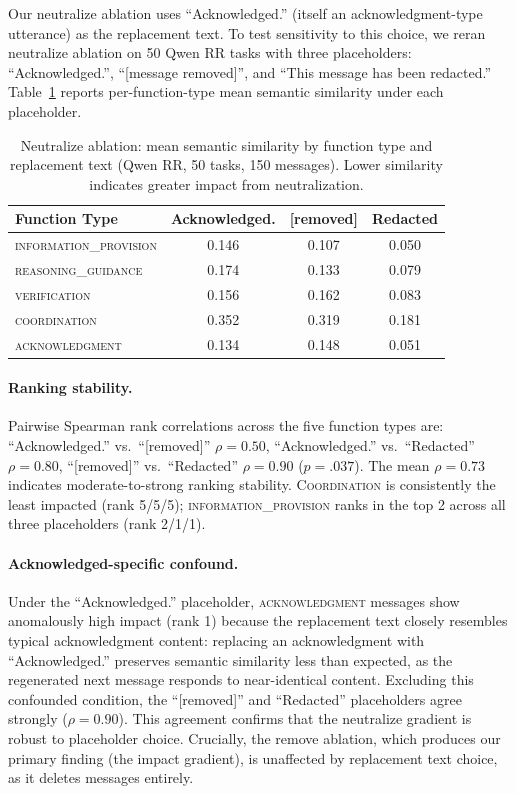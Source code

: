 Our neutralize ablation uses ``Acknowledged.'' (itself an acknowledgment-type utterance) as the replacement text. To test sensitivity to this choice, we reran neutralize ablation on 50 Qwen RR tasks with three placeholders: ``Acknowledged.'', ``{[message removed]}'', and ``This message has been redacted.'' Table~\ref{tab:placeholder_sensitivity} reports per-function-type mean semantic similarity under each placeholder.

\begin{table}[htbp]
\centering
\caption{Neutralize ablation: mean semantic similarity by function type and replacement text (Qwen RR, 50 tasks, 150 messages). Lower similarity indicates greater impact from neutralization.}
\label{tab:placeholder_sensitivity}
\small
\begin{tabular}{lccc}
\toprule
\textbf{Function Type} & \textbf{Acknowledged.} & \textbf{[removed]} & \textbf{Redacted} \\
\midrule
\textsc{information\_provision} & 0.146 & 0.107 & 0.050 \\
\textsc{reasoning\_guidance}    & 0.174 & 0.133 & 0.079 \\
\textsc{verification}           & 0.156 & 0.162 & 0.083 \\
\textsc{coordination}           & 0.352 & 0.319 & 0.181 \\
\textsc{acknowledgment}         & 0.134 & 0.148 & 0.051 \\
\bottomrule
\end{tabular}
\end{table}

\paragraph{Ranking stability.} Pairwise Spearman rank correlations across the five function types are: ``Acknowledged.'' vs.\ ``{[removed]}'' $\rho = 0.50$, ``Acknowledged.'' vs.\ ``Redacted'' $\rho = 0.80$, ``{[removed]}'' vs.\ ``Redacted'' $\rho = 0.90$ ($p = .037$). The mean $\rho = 0.73$ indicates moderate-to-strong ranking stability. \textsc{Coordination} is consistently the least impacted (rank 5/5/5); \textsc{information\_provision} ranks in the top 2 across all three placeholders (rank 2/1/1).

\paragraph{Acknowledged-specific confound.} Under the ``Acknowledged.'' placeholder, \textsc{acknowledgment} messages show anomalously high impact (rank 1) because the replacement text closely resembles typical acknowledgment content: replacing an acknowledgment with ``Acknowledged.'' preserves semantic similarity less than expected, as the regenerated next message responds to near-identical content. Excluding this confounded condition, the ``{[removed]}'' and ``Redacted'' placeholders agree strongly ($\rho = 0.90$). This agreement confirms that the neutralize gradient is robust to placeholder choice. Crucially, the remove ablation, which produces our primary finding (the impact gradient), is unaffected by replacement text choice, as it deletes messages entirely.

